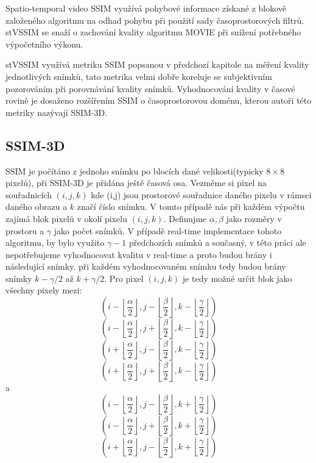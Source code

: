 \documentclass[thesis=M,czech]{FITthesis}[2016/06/26]
\begin{document}
Spatio-temporal video SSIM využívá pohybové informace získané z blokově založeného algoritmu na odhad pohybu při použití sady časoprostorových filtrů. stVSSIM se snaží o zachování kvality algoritmu MOVIE při snížení potřebného výpočetního výkonu.

stVSSIM využívá metriku SSIM popsanou v předchozí kapitole na měření kvality jednotlivých snímků, tato metrika velmi dobře koreluje se subjektivním pozorováním při porovnávání kvality snímků\cite{SSIM3}. Vyhodnocování kvality v časové rovině je dosaženo rozšířením SSIM o časoprostorovou doménu, kterou autoři této metriky nazývají SSIM-3D. 

\subsection{SSIM-3D}
SSIM je počítáno z jednoho snímku po blocích dané velikosti(typicky $8\times8$ pixelů), při SSIM-3D je přidána ještě časová osa. Vezměme si pixel na souřadnicích $(i,j,k)$ kde (i,j) jsou prostorové souřadnice daného pixelu v rámsci daného obrazu a $k$ značí číslo snímku. V tomto případě nás při každém výpočtu zajímá blok pixelů v okolí pixelu $(i,j,k)$. Definujme $\alpha, \beta$ jako rozměry v prostoru a $\gamma$ jako počet snímků. V případě real-time implementace tohoto algoritmu, by bylo využito $\gamma -1$ předchozích snímků a současný, v této práci ale nepotřebujeme vyhodnocovat kvalitu v real-time a proto budou brány i následující snímky. při každém vyhodnocovaném snímku tedy budou brány snímky $k-\gamma/2$ až $k+\gamma/2$. Pro pixel $(i,j,k)$ je tedy možné určit blok jako všechny pixely mezi:
$$(i-\left \lfloor{\frac{\alpha}{2}}\right \rfloor,j-\left \lfloor{\frac{\beta}{2}}\right \rfloor,k-\left \lfloor{\frac{\gamma}{2}}\right \rfloor)$$
$$(i-\left \lfloor{\frac{\alpha}{2}}\right \rfloor,j+\left \lfloor{\frac{\beta}{2}}\right \rfloor,k-\left \lfloor{\frac{\gamma}{2}}\right \rfloor)$$
$$(i+\left \lfloor{\frac{\alpha}{2}}\right \rfloor,j-\left \lfloor{\frac{\beta}{2}}\right \rfloor,k-\left \lfloor{\frac{\gamma}{2}}\right \rfloor)$$
$$(i+\left \lfloor{\frac{\alpha}{2}}\right \rfloor,j+\left \lfloor{\frac{\beta}{2}}\right \rfloor,k-\left \lfloor{\frac{\gamma}{2}}\right \rfloor)$$
a
$$(i-\left \lfloor{\frac{\alpha}{2}}\right \rfloor,j-\left \lfloor{\frac{\beta}{2}}\right \rfloor,k+\left \lfloor{\frac{\gamma}{2}}\right \rfloor)$$
$$(i-\left \lfloor{\frac{\alpha}{2}}\right \rfloor,j+\left \lfloor{\frac{\beta}{2}}\right \rfloor,k+\left \lfloor{\frac{\gamma}{2}}\right \rfloor)$$
$$(i+\left \lfloor{\frac{\alpha}{2}}\right \rfloor,j-\left \lfloor{\frac{\beta}{2}}\right \rfloor,k+\left \lfloor{\frac{\gamma}{2}}\right \rfloor)$$
\end{document}
